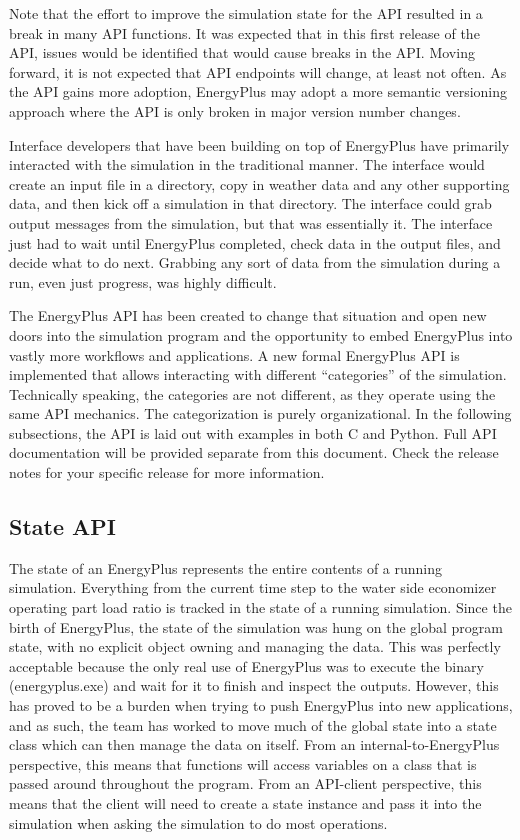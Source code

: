 Note that the effort to improve the simulation state for the API resulted in a break in many API functions.
It was expected that in this first release of the API, issues would be identified that would cause breaks in the API.
Moving forward, it is not expected that API endpoints will change, at least not often.
As the API gains more adoption, EnergyPlus may adopt a more semantic versioning approach where the API is only broken in major version number changes.

Interface developers that have been building on top of EnergyPlus have primarily interacted with the simulation in the traditional manner.
The interface would create an input file in a directory, copy in weather data and any other supporting data, and then kick off a simulation in that directory.
The interface could grab output messages from the simulation, but that was essentially it.
The interface just had to wait until EnergyPlus completed, check data in the output files, and decide what to do next.
Grabbing any sort of data from the simulation during a run, even just progress, was highly difficult.

The EnergyPlus API has been created to change that situation and open new doors into the simulation program and the opportunity to embed EnergyPlus into vastly more workflows and applications.
A new formal EnergyPlus API is implemented that allows interacting with different ``categories'' of the simulation.
Technically speaking, the categories are not different, as they operate using the same API mechanics.
The categorization is purely organizational.
In the following subsections, the API is laid out with examples in both C and Python.
Full API documentation will be provided separate from this document.
Check the release notes for your specific release for more information.

\subsection{State API}\label{subsec:state-api}

The state of an EnergyPlus represents the entire contents of a running simulation.
Everything from the current time step to the water side economizer operating part load ratio is tracked in the state of a running simulation.
Since the birth of EnergyPlus, the state of the simulation was hung on the global program state, with no explicit object owning and managing the data.
This was perfectly acceptable because the only real use of EnergyPlus was to execute the binary (energyplus.exe) and wait for it to finish and inspect the outputs.
However, this has proved to be a burden when trying to push EnergyPlus into new applications, and as such, the team has worked to move much of the global state into a state class which can then manage the data on itself.
From an internal-to-EnergyPlus perspective, this means that functions will access variables on a class that is passed around throughout the program.
From an API-client perspective, this means that the client will need to create a state instance and pass it into the simulation when asking the simulation to do most operations.

